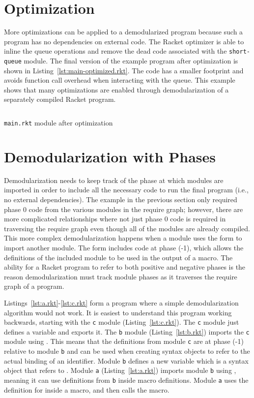 \section{Optimization}

More optimizations can be applied to a demodularized program because such a program has no dependencies on external code.
The Racket optimizer is able to inline the queue operations and remove the dead code associated with the \texttt{short-queue} module. 
The final version of the example program after optimization is shown in Listing~\ref{lst:main-optimized.rkt}. 
The code has a smaller footprint and avoids function call overhead when interacting with the queue.
This example shows that many optimizations are enabled through demodularization of a separately compiled Racket program.

\begin{listing}[tb]
  \inputminted{racket}{listings/main-optimized.rkt}
  \caption{\texttt{main.rkt} module after optimization}
  \label{lst:main-optimized.rkt}
\end{listing}

\section{Demodularization with Phases}

Demodularization needs to keep track of the phase at which modules are imported in order to include all the necessary code to run the final program (i.e., no external dependencies).
The example in the previous section only required phase 0 code from the various modules in the require graph; however, there are more complicated relationships where not just phase 0 code is required in traversing the require graph even though all of the modules are already compiled.
This more complex demodularization happens when a module uses the  form to import another module.
The  form includes code at phase (-1), which allows the definitions of the included module to be used in the output of a macro. 
The ability for a Racket program to refer to both positive and negative phases is the reason demodularization must track module phases as it traverses the require graph of a program.

Listings~\ref{lst:a.rkt}-\ref{lst:c.rkt} form a program where a simple demodularization algorithm would not work.
It is easiest to understand this program working backwards, starting with the \texttt{c} module (Listing~\ref{lst:c.rkt}).
The \texttt{c} module just defines a variable  and exports it.
The \texttt{b} module (Listing~\ref{lst:b.rkt}) imports the \texttt{c} module using .
This means that the definitions from module \texttt{c} are at phase (-1) relative to module \texttt{b} and can be used when creating syntax objects to refer to the actual binding of an identifier.
Module \texttt{b} defines a new variable  which is a syntax object that refers to .
Module \texttt{a} (Listing~\ref{lst:a.rkt}) imports module \texttt{b} using , meaning it can use definitions from \texttt{b} inside macro definitions.
Module \texttt{a} uses the definition for  inside a macro, and then calls the macro.

